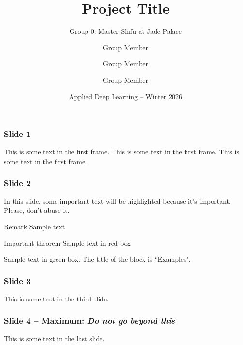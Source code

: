 \documentclass{beamer}
\title[Title]
{Project Title}
\subtitle{Group 0: Master Shifu at Jade Palace}
\author[Group 0: Master Shifu at Jade Palace] 
{Group Member\inst{1} \and Group Member\inst{2} \and Group Member\inst{3}}
\institute[ ] %
{
  \inst{1}%
  Department
  \and
  \inst{2}%
  Department
  \and
   \inst{3}%
  Department
}
\date[AplDL] %
{Applied Deep Learning -- Winter 2026}
\begin{document}
\frame{\titlepage}


\begin{frame}
\frametitle{Slide 1}
This is some text in the first frame. This is some text in the first frame. This is some text in the first frame.
\end{frame}


\begin{frame}
\frametitle{Slide 2}

In this slide, some important text will be
\alert{highlighted} because it's important.
Please, don't abuse it.

\begin{block}{Remark}
Sample text
\end{block}

\begin{alertblock}{Important theorem}
Sample text in red box
\end{alertblock}

\begin{examples}
Sample text in green box. The title of the block is ``Examples".
\end{examples}
\end{frame}

\begin{frame}
	\frametitle{Slide 3}
	This is some text in the third slide.
\end{frame}

\begin{frame}
	\frametitle{Slide 4 -- Maximum: \textit{Do not go beyond this}}
	This is some text in the last slide.
\end{frame}
\end{document}
